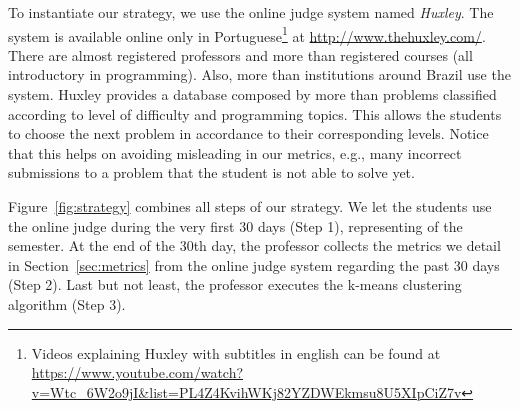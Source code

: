 To instantiate our strategy, we use the online judge system named \textit{Huxley}. The system is available online only in Portuguese\footnote{Videos explaining Huxley with subtitles in english can be found at \url{https://www.youtube.com/watch?v=Wtc_6W2o9jI&list=PL4Z4KvihWKj82YZDWEkmsu8U5XIpCiZ7v}} at \url{http://www.thehuxley.com/}. There are almost \huxleyProfessors registered professors and more than \huxleyCourses registered courses (all introductory in programming). Also, more than \huxleyInstitutions institutions around Brazil use the system. Huxley provides a database composed by more than \huxleyProblems problems classified according to level of difficulty and programming topics. This allows the students to choose the next problem in accordance to their corresponding levels. Notice that this helps on avoiding misleading in our metrics, e.g., many incorrect submissions to a problem that the student is not able to solve yet.





Figure~\ref{fig:strategy} combines all steps of our strategy. We let the students use the online judge during the very first 30 days (Step 1), representing \semesterPercentage of the semester. At the end of the 30th day, the professor collects the metrics we detail in Section~\ref{sec:metrics} from the online judge system regarding the past 30 days (Step 2). Last but not least, the professor executes the k-means clustering algorithm (Step 3).


